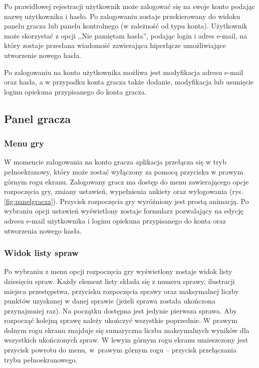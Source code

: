         Po prawidłowej rejestracji użytkownik może zalogować się na swoje konto podając nazwę użytkownika i hasło. Po zalogowaniu zostaje przekierowany do widoku panelu gracza lub panelu kontrolnego (w zależność od typu konta).
        Użytkownik może skorzystać z opcji ,,Nie pamiętam hasła'', podając login i adres e-mail, na który zostaje przesłana wiadomość zawierająca hiperłącze umożliwiające utworzenie nowego hasła.
        
        Po zalogowaniu na konto użytkownika możliwa jest modyfikacja adresu e-mail oraz hasła, a w przypadku konta gracza także dodanie, modyfikacja lub usunięcie loginu opiekuna przypisanego do konta gracza.

    \subsection{Panel gracza}
        
        \subsubsection{Menu gry}
        W momencie zalogowania na konto gracza aplikacja przełącza się w tryb pełnoekranowy, który może zostać wyłączony za pomocą przycisku w prawym górnym rogu ekranu.
        Zalogowany gracz ma dostęp do menu zawierającego opcje rozpoczęcia gry, zmiany ustawień, wypełnienia ankiety oraz wylogowania (rys. \ref{fig:panelgracza}).
        Przycisk rozpoczęcia gry wyróżniony jest prostą animacją.
        Po wybraniu opcji ustawień wyświetlony zostaje formularz pozwalający na edycję adresu e-mail użytkownika i loginu opiekuna przypisanego do konta oraz utworzenia nowego hasła. 
        
        \subsubsection{Widok listy spraw}
        Po wybraniu z menu opcji rozpoczęcia gry wyświetlony zostaje widok listy dziesięciu spraw.
        Każdy element listy składa się z numeru sprawy, ilustracji miejsca przestępstwa, przycisku rozpoczęcia sprawy oraz maksymalnej liczby punktów uzyskanej w danej sprawie (jeżeli sprawa została ukończona przynajmniej raz).
        Na początku dostępna jest jedynie pierwsza sprawa.
        Aby rozpocząć kolejną sprawę należy ukończyć wszystkie poprzednie.
        W prawym dolnym rogu ekranu znajduje się sumaryczna liczba maksymalnych wyników dla wszystkich ukończonych spraw.
        W lewym górnym rogu ekranu umieszczony jest przycisk powrotu do menu, w~prawym górnym rogu -- przycisk przełączania trybu pełnoekranowego.
        
